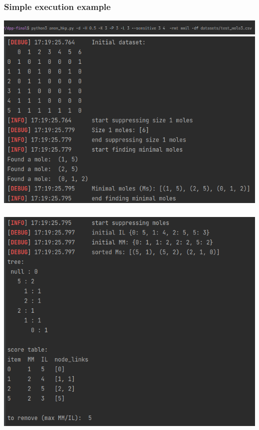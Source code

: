 \documentclass{beamer}
\begin{document}
\begin{frame}[fragile]
\frametitle{Simple execution example}
\includegraphics[scale=0.335]{test/prompt}
\includegraphics[scale=0.4]{test/part1}
\end{frame}
\begin{frame}[fragile]
\frametitle{ }
\includegraphics[scale=0.4]{test/part2_1}
\end{frame}
\end{document}
